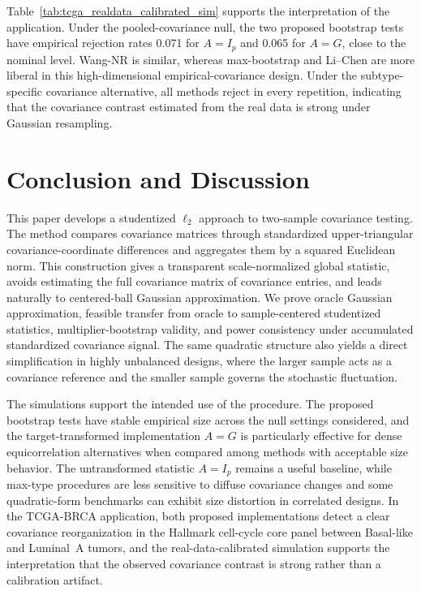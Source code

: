 \documentclass[
  12pt]{article}
\theoremstyle{plain}
\theoremstyle{definition}
\theoremstyle{remark}
\begin{document}
Table~\ref{tab:tcga_realdata_calibrated_sim} supports the interpretation of the application.  Under the pooled-covariance null, the two proposed bootstrap tests have empirical rejection rates 0.071 for \(A=I_p\) and 0.065 for \(A=G\), close to the nominal level.  Wang-NR is similar, whereas max-bootstrap and Li--Chen are more liberal in this high-dimensional empirical-covariance design.  Under the subtype-specific covariance alternative, all methods reject in every repetition, indicating that the covariance contrast estimated from the real data is strong under Gaussian resampling.
\section{Conclusion and Discussion}\label{sec:discussion}

This paper develops a studentized \(\ell_2\) approach to two-sample covariance
testing.  The method compares covariance matrices through standardized
upper-triangular covariance-coordinate differences and aggregates them by a
squared Euclidean norm.  This construction gives a transparent scale-normalized
global statistic, avoids estimating the full covariance matrix of covariance
entries, and leads naturally to centered-ball Gaussian approximation.  We prove
oracle Gaussian approximation, feasible transfer from oracle to sample-centered
studentized statistics, multiplier-bootstrap validity, and power consistency
under accumulated standardized covariance signal.  The same quadratic structure
also yields a direct simplification in highly unbalanced designs, where the
larger sample acts as a covariance reference and the smaller sample governs the
stochastic fluctuation.

The simulations support the intended use of the procedure.  The proposed
bootstrap tests have stable empirical size across the null settings considered,
and the target-transformed implementation \(A=G\) is particularly effective for
dense equicorrelation alternatives when compared among methods with acceptable
size behavior.  The untransformed statistic \(A=I_p\) remains a useful baseline,
while max-type procedures are less sensitive to diffuse covariance changes and
some quadratic-form benchmarks can exhibit size distortion in correlated
designs.  In the TCGA-BRCA application, both proposed implementations detect a
clear covariance reorganization in the Hallmark cell-cycle core panel between
Basal-like and Luminal~A tumors, and the real-data-calibrated simulation
supports the interpretation that the observed covariance contrast is strong
rather than a calibration artifact.
\end{document}
